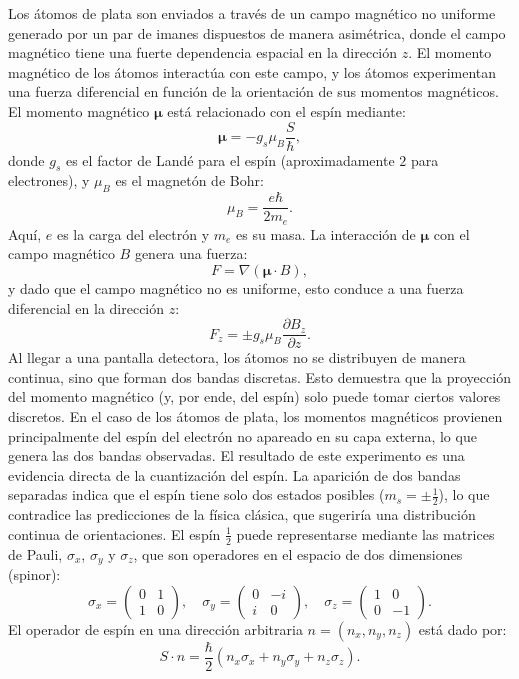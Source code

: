 Los átomos de plata son enviados a través de un campo magnético no uniforme generado por un par de imanes dispuestos de manera asimétrica, donde el campo magnético tiene una fuerte dependencia espacial en la dirección $z$. El momento magnético de los átomos interactúa con este campo, y los átomos experimentan una fuerza diferencial en función de la orientación de sus momentos magnéticos.
\noindent
El momento magnético $\boldsymbol{\mu}$ está relacionado con el espín mediante:
\[
\boldsymbol{\mu} = -g_s \mu_B \frac{{S}}{\hbar},
\]
donde $g_s$ es el factor de Landé para el espín (aproximadamente $2$ para electrones), y $\mu_B$ es el magnetón de Bohr:
\[
\mu_B = \frac{e\hbar}{2m_e}.
\]
Aquí, $e$ es la carga del electrón y $m_e$ es su masa.
\noindent
La interacción de $\boldsymbol{\mu}$ con el campo magnético ${B}$ genera una fuerza:
\[
{F} = \nabla(\boldsymbol{\mu} \cdot {B}),
\]
y dado que el campo magnético no es uniforme, esto conduce a una fuerza diferencial en la dirección $z$:
\[
F_z = \pm g_s \mu_B \frac{\partial B_z}{\partial z}.
\]
\noindent
Al llegar a una pantalla detectora, los átomos no se distribuyen de manera continua, sino que forman dos bandas discretas. Esto demuestra que la proyección del momento magnético (y, por ende, del espín) solo puede tomar ciertos valores discretos. En el caso de los átomos de plata, los momentos magnéticos provienen principalmente del espín del electrón no apareado en su capa externa, lo que genera las dos bandas observadas.
\noindent
El resultado de este experimento es una evidencia directa de la cuantización del espín. La aparición de dos bandas separadas indica que el espín tiene solo dos estados posibles ($m_s = \pm\frac{1}{2}$), lo que contradice las predicciones de la física clásica, que sugeriría una distribución continua de orientaciones.
\noindent
El espín $\frac{1}{2}$ puede representarse mediante las matrices de Pauli, $\sigma_x$, $\sigma_y$ y $\sigma_z$, que son operadores en el espacio de dos dimensiones (spinor):
\[
\sigma_x = 
\begin{pmatrix}
0 & 1 \\
1 & 0
\end{pmatrix}, \quad
\sigma_y = 
\begin{pmatrix}
0 & -i \\
i & 0
\end{pmatrix}, \quad
\sigma_z = 
\begin{pmatrix}
1 & 0 \\
0 & -1
\end{pmatrix}.
\]
El operador de espín en una dirección arbitraria ${n} = (n_x, n_y, n_z)$ está dado por:
\[
{S} \cdot {n} = \frac{\hbar}{2}(n_x \sigma_x + n_y \sigma_y + n_z \sigma_z).
\]
